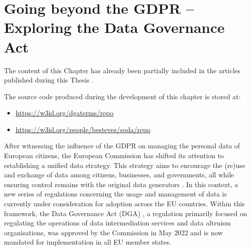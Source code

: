 \chapter{Going beyond the GDPR -- Exploring the Data Governance Act}
\label{chap:dga}

\begin{tcolorbox}[colback=royallavender!40]
The content of this Chapter has already been partially included in the articles published during this Thesis \citep{esteves_semantifying_2022,esteves_semantics_2023,esteves_towards_2023}.
\end{tcolorbox}

\begin{tcolorbox}[colback=royallavender!10]
The source code produced during the development of this chapter is stored at:
\begin{itemize}
    \item \url{https://w3id.org/dgaterms/repo}
    \item \url{https://w3id.org/people/besteves/soda/repo}
\end{itemize}
\end{tcolorbox}

After witnessing the influence of the GDPR on managing the personal data of European citizens, the European Commission has shifted its attention to establishing a unified data strategy.
This strategy aims to encourage the (re)use and exchange of data among citizens, businesses, and governments, all while ensuring control remains with the original data generators \citep{european_commission_communication_2020}.
In this context, a new series of regulations concerning the usage and management of data is currently under consideration for adoption across the EU countries.
Within this framework, the Data Governance Act (DGA) \citeyearpar{noauthor_regulation_2022}, a regulation primarily focused on regulating the operations of data intermediation services and data altruism organisations, was approved by the Commission in May 2022 and is now mandated for implementation in all EU member states.

